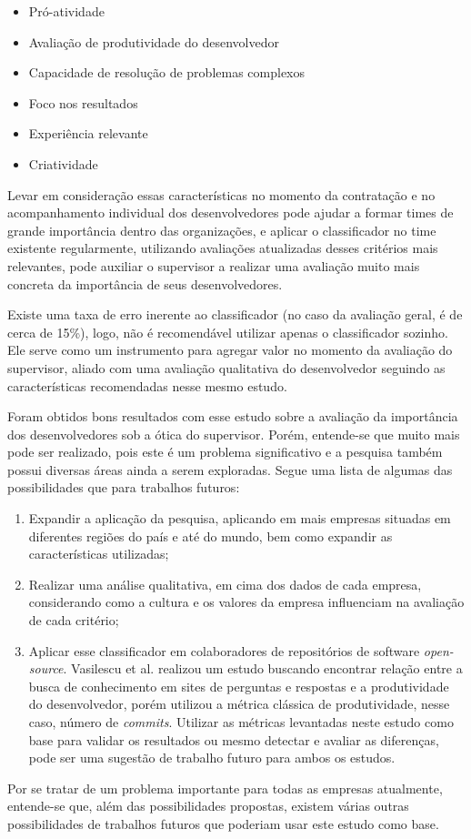 \begin{itemize}
	\item Pró-atividade
	\item Avaliação de produtividade do desenvolvedor
	\item Capacidade de resolução de problemas complexos
	\item Foco nos resultados
	\item Experiência relevante
	\item Criatividade
\end{itemize}

Levar em consideração essas características no momento da contratação e no acompanhamento individual dos desenvolvedores pode ajudar a formar times de grande importância dentro das organizações, e aplicar o classificador no time existente regularmente, utilizando avaliações atualizadas desses critérios mais relevantes, pode auxiliar o supervisor a realizar uma avaliação muito mais concreta da importância de seus desenvolvedores.

Existe uma taxa de erro inerente ao classificador (no caso da avaliação geral, é de cerca de 15\%), logo, não é recomendável utilizar apenas o classificador sozinho. Ele serve como um instrumento para agregar valor no momento da avaliação do supervisor, aliado com uma avaliação qualitativa do desenvolvedor seguindo as características recomendadas nesse mesmo estudo.

Foram obtidos bons resultados com esse estudo sobre a avaliação da importância dos desenvolvedores sob a ótica do supervisor. Porém, entende-se que muito mais pode ser realizado, pois este é um problema significativo e a pesquisa também possui diversas áreas ainda a serem exploradas. Segue uma lista de algumas das possibilidades que para trabalhos futuros:
\begin{enumerate}
	\item Expandir a aplicação da pesquisa, aplicando em mais empresas situadas em diferentes regiões do país e até do mundo, bem como expandir as características utilizadas;
	\item Realizar uma análise qualitativa, em cima dos dados de cada empresa, considerando como a cultura e os valores da empresa influenciam na avaliação de cada critério;
	\item Aplicar esse classificador em colaboradores de repositórios de software \textit{open-source}. Vasilescu et al. \cite{Vasilescu2013} realizou um estudo buscando encontrar relação entre a busca de conhecimento em sites de perguntas e respostas e a produtividade do desenvolvedor, porém utilizou a métrica clássica de produtividade, nesse caso, número de \textit{commits}. Utilizar as métricas levantadas neste estudo como base para validar os resultados ou mesmo detectar e avaliar as diferenças, pode ser uma sugestão de trabalho futuro para ambos os estudos.
\end{enumerate}

Por se tratar de um problema importante para todas as empresas atualmente, entende-se que, além das possibilidades propostas, existem várias outras possibilidades de trabalhos futuros que poderiam usar este estudo como base.
